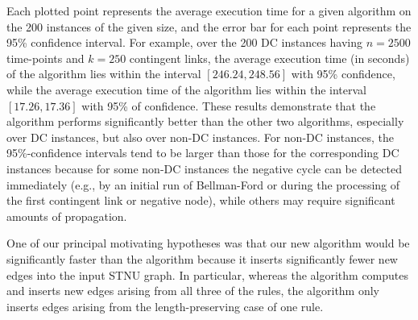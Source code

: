 \documentclass[a4paper,11pt]{article}
\begin{document}
Each plotted point represents the average execution time for a given algorithm on the 200 instances of the given size, and the error bar for each point represents the 95\% confidence interval. 
For example, over the 200 DC instances having $n=2500$ time-points and $k=250$ contingent links,
the average execution time (in seconds) of the \morrisFourteen algorithm lies within the interval 
$[246.24, 248.56]$ with 95\% confidence, while the average execution time of the \rulTwenty algorithm
lies within the interval $[17.26,17.36]$ with 95\% of confidence.
%
These results demonstrate that the \rulTwenty algorithm performs significantly better than the other two algorithms, especially over DC instances, but also over non-DC instances.
For non-DC instances, the 95\%-confidence intervals tend to be larger than those for the corresponding DC instances because for some non-DC instances the negative cycle can be detected immediately (e.g., by an
initial run of Bellman-Ford or during the processing of the first contingent link or negative node), while
others may require significant amounts of propagation.

One of our principal motivating hypotheses was that our new algorithm would be significantly
faster than the \RULminus algorithm because it inserts significantly fewer new edges into the input STNU graph. 
In particular, whereas the \RULminus algorithm computes and inserts new edges arising
from all three of the \RULminus rules, the \rulTwenty algorithm  only inserts edges arising from the length-preserving case of one rule.  


\color{black}


\end{document}
